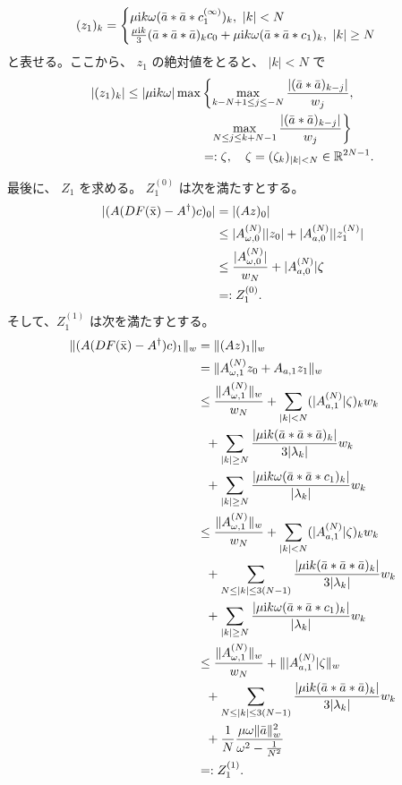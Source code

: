 \footnotesize
$$
    (z_1)_k = 
    \begin{cases}
    \mu \mathrm{i} k \omega (\bar{a} * \bar{a} * c_1^{(\infty)})_k , ~ |k| < N\\
    \frac{\mu \mathrm{i} k}{3}(\bar{a} * \bar{a} * \bar{a})_k c_0 + \mu \mathrm{i} k \omega (\bar{a} * \bar{a} * c_1)_k, ~ |k| \geq N
    \end{cases}
$$
\normalsize
と表せる。ここから、 $z_1$ の絶対値をとると、 $|k| < N$ で
\begin{align*}
    |(z_1)_k| \leq |\mu \mathrm{i} k \omega| \max
    &\left\{ 
    \max_{k-N+1 \leq j \leq -N} \frac{|(\bar{a} * \bar{a})_{k-j}|}{w_j}, \right. \\
    &~~ \left. \max_{N \leq j \leq k+N-1} \frac{|(\bar{a} * \bar{a})_{k-j}|}{w_j}
    \right\} \\
    &=:\zeta,\quad \zeta = (\zeta_k)_{|k| < N} \in \mathbb{R}^{2N-1}.
\end{align*}

最後に、 $Z_1$ を求める。 $Z_1^{(0)}$ は次を満たすとする。
    \begin{align*}
    |(A(DF(\bar{\mathrm x}) - A^\dagger)c)_0| &= |(Az)_0| \\
    &\leq |A_{\omega,0}^{(N)}| |z_0| + |A_{a,0}^{(N)}| | z_1^{(N)}| \\
    &\leq \frac{|A_{\omega,0}^{(N)}|}{w_{N}} + |A_{a,0}^{(N)}|\zeta \\
    &=: Z_1^{(0)}.
    \end{align*}
そして、$Z_1^{(1)}$ は次を満たすとする。
\footnotesize
    \begin{align*}
    \|(A(DF(\bar{\mathrm x}) - A^\dagger)c)_1 \|_w &= \|(Az)_1 \|_w \\
    &= \| A_{\omega,1}^{(N)} z_0 + A_{a,1} z_1 \|_w \\
    &\leq \frac{\|A_{\omega,1}^{(N)} \|_w}{w_{N}} + \sum_{|k|<N} (|A_{a,1}^{(N)}| \zeta)_k w_k \\
    &~~+ \sum_{|k| \geq N} \frac{|\mu \mathrm{i} k (\bar{a}*\bar{a}*\bar{a})_k |}{3|\lambda_k |} w_k  \\
    &~~+ \sum_{|k| \geq N} \frac{ |\mu \mathrm{i} k \omega ( \bar{a} * \bar{a} * c_1 )_k |}{|\lambda_k|} w_k \\
    &\leq \frac{\|A_{\omega,1}^{(N)} \|_w}{w_{N}} + \sum_{|k|<N} (|A_{a,1}^{(N)}| \zeta)_k w_k\\
    &~~+ \sum_{N\le |k| \le 3(N-1)} \frac{|\mu \mathrm{i} k (\bar{a}*\bar{a}*\bar{a})_k |}{3|\lambda_k |} w_k  \\
    &~~+ \sum_{|k| \geq N} \frac{ |\mu \mathrm{i} k \omega ( \bar{a} * \bar{a} * c_1 )_k |}{|\lambda_k|} w_k \\
    &\leq \frac{\| A_{\omega,1}^{(N)} \|_w}{w_{N}} + \| |A_{a,1}^{(N)}| \zeta \|_w \\
    &~~+ \sum_{N\le |k| \le 3(N-1)} \frac{|\mu \mathrm{i} k (\bar{a}*\bar{a}*\bar{a})_k |}{3|\lambda_k |} w_k  \\
    &~~+ \frac{1}{N} \frac{\mu \omega \|\bar{a} \|_{w}^2}{\omega^2 - \frac{1}{N^2}} \\
    &=: Z_1^{(1)}.
    \end{align*}
\normalsize

